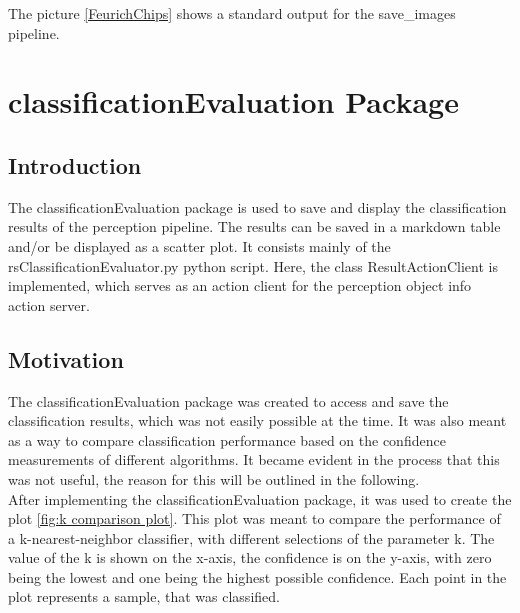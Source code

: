 \documentclass[main.tex]{subfiles}
\begin{document}
The picture \ref{FeurichChips} shows a standard output for the save\_images pipeline.

\section{classificationEvaluation Package}

\subsection{Introduction}
The classificationEvaluation package is used to save and display the classification results of the perception pipeline. The results can be saved in a markdown table and/or be displayed as a scatter plot. It consists mainly of the rsClassificationEvaluator.py python script. Here, the class ResultActionClient is implemented, which serves as an action client for the perception object info action server.\\

\subsection{Motivation}
The classificationEvaluation package was created to access and save the classification results, which was not easily possible at the time. It was also meant as a way to compare classification performance based on the confidence measurements of different algorithms. It became evident in the process that this was not useful, the reason for this will be outlined in the following.\\

After implementing the classificationEvaluation package, it was used to create the plot \ref{fig:k comparison plot}. This plot was meant to compare the performance of a k-nearest-neighbor classifier, with different selections of the parameter k. The value of the k is shown on the x-axis, the confidence is on the y-axis, with zero being the lowest and one being the highest possible confidence. Each point in the plot represents a sample, that was classified.\\
\end{document}
